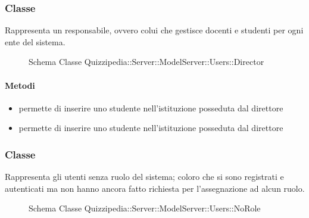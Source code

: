\subsubsection{Classe }
Rappresenta un responsabile, ovvero colui che gestisce docenti e studenti per ogni ente del sistema.
\begin{figure}[H]
\centering
\noindent{}
\caption[Schema Classe Director]{Schema Classe Quizzipedia::Server::ModelServer::Users::Director}
\end{figure}
\paragraph{Metodi}
\begin{itemize}
\item {}
\newline
permette di inserire uno studente nell'istituzione posseduta dal direttore
\newline
\item {}
\newline
permette di inserire uno studente nell'istituzione posseduta dal direttore
\newline
\end{itemize}
\subsubsection{Classe }
Rappresenta gli utenti senza ruolo del sistema; coloro che si sono registrati e autenticati ma non hanno ancora fatto richiesta per l'assegnazione ad alcun ruolo.
\begin{figure}[H]
\centering
\noindent{}
\caption[Schema Classe NoRole]{Schema Classe Quizzipedia::Server::ModelServer::Users::NoRole}
\end{figure}
